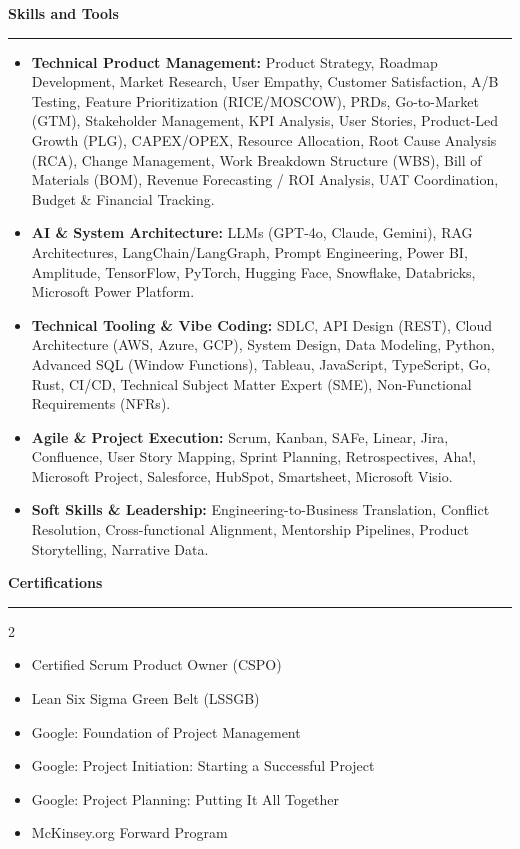 \documentclass[9pt,letterpaper]{article} %
\newenvironment{rSection}[1]{ %
  \sectionskip
 \textbf{\Large #1} %
  \sectionlineskip
  \hrule %
  \begin{list}{}{ %
    \setlength{\leftmargin}{-0em} %
  }
  \item[]
}{
  \end{list}
}
\def\sectionlineskip{\smallskip} %
\def\sectionskip{} %
\begin{document}
\begin{rSection}{Skills and Tools}
\begin{itemize}[left=-1.5em, labelsep=.1cm, labelwidth=.2cm, itemsep=0.0em, topsep=0pt]
\item \textbf{Technical Product Management:} Product Strategy, Roadmap Development, Market Research, User Empathy, Customer Satisfaction, A/B Testing, Feature Prioritization (RICE/MOSCOW), PRDs, Go-to-Market (GTM), Stakeholder Management, KPI Analysis, User Stories, Product-Led Growth (PLG), CAPEX/OPEX, Resource Allocation, Root Cause Analysis (RCA), Change Management, Work Breakdown Structure (WBS), Bill of Materials (BOM), Revenue Forecasting / ROI Analysis, UAT Coordination, Budget \& Financial Tracking.
\item \textbf{AI \& System Architecture:} LLMs (GPT-4o, Claude, Gemini), RAG Architectures, LangChain/LangGraph, Prompt Engineering, Power BI, Amplitude, TensorFlow, PyTorch, Hugging Face, Snowflake, Databricks, Microsoft Power Platform.
\item \textbf{Technical Tooling \& Vibe Coding:} SDLC, API Design (REST), Cloud Architecture (AWS, Azure, GCP), System Design, Data Modeling, Python, Advanced SQL (Window Functions), Tableau, JavaScript, TypeScript, Go, Rust, CI/CD, Technical Subject Matter Expert (SME), Non-Functional Requirements (NFRs).
\item \textbf{Agile \& Project Execution:} Scrum, Kanban, SAFe, Linear, Jira, Confluence, User Story Mapping, Sprint Planning, Retrospectives, Aha!, Microsoft Project, Salesforce, HubSpot, Smartsheet, Microsoft Visio.
\item \textbf{Soft Skills \& Leadership:} Engineering-to-Business Translation, Conflict Resolution, Cross-functional Alignment, Mentorship Pipelines, Product Storytelling, Narrative Data.
\end{itemize}
\end{rSection}%
\begin{rSection}{Certifications}
\begin{multicols}{2}
\begin{itemize}[left=-1.5em, labelsep=.1cm, labelwidth=.2cm, itemsep=0.0em, topsep=0pt]
\item Certified Scrum Product Owner (CSPO)
\item Lean Six Sigma Green Belt (LSSGB)
\item Google: Foundation of Project Management
\item Google: Project Initiation: Starting a Successful Project
\item Google: Project Planning: Putting It All Together
\item McKinsey.org Forward Program
\end{itemize}
\end{multicols}
\end{rSection}
\end{document}
